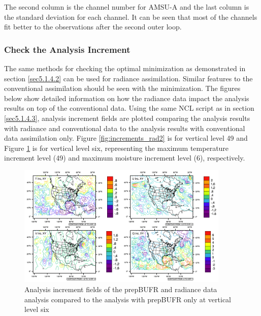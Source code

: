 The second column is the channel number for AMSU-A and the last column is the standard deviation for each channel.  It can be seen that most of the channels fit better to the observations after the second outer loop. 

\subsubsection{Check the Analysis Increment}

The same methods for checking the optimal minimization as demonstrated in section \ref{sec5.1.4.2} can be used for radiance assimilation.  Similar features to the conventional assimilation should be seen with the minimization. The figures below show detailed information on how the radiance data impact the analysis results on top of the conventional data.  Using the same NCL script as in section \ref{sec5.1.4.3}, analysis increment fields are plotted comparing the analysis results with radiance and conventional data to the analysis results with conventional data assimilation only.  Figure \ref{fig:increments_rad2} is for vertical level 49 and Figure \ref{fig:increments_rad} is for vertical level six, representing the maximum temperature increment level (49) and maximum moisture increment level (6), respectively.  

\begin{figure}[h!]
  \centering
  \includegraphics[width=0.9\textwidth]{images/increments_rad}
  \caption{Analysis increment fields of the prepBUFR and radiance data analysis compared to the analysis with prepBUFR only at vertical level six}
  \label{fig:increments_rad}
\end{figure}

